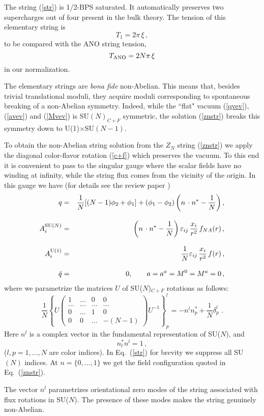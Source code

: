 \documentclass[epsfig,12pt]{article}
\def\beqn{\begin{eqnarray}}
\def\eeqn{\end{eqnarray}}
\def\beq{\begin{equation}}
\def\eeq{\end{equation}}
\begin{document}
The  string (\ref{str}) is 1/2-BPS saturated. It automatically 
preserves two supercharges out of 
four present in the bulk theory.
The tension of this elementary string is
\beq
T_1=2\pi\,\xi\, ,
\label{ten}
\eeq
to be compared with  the   ANO
string tension,
\beq
T_{\rm ANO}=2N\pi\,\xi
\label{tenANO}
\eeq
in our normalization.

The elementary strings are {\em bona fide} non-Abelian.
This means that, besides trivial translational
moduli, they acquire moduli corresponding to spontaneous
breaking of a non-Abelian symmetry. Indeed, while the ``flat"
vacuum (\ref{qvev}), (\ref{avev}) and (\ref{Mvev}) 
is SU$(N)_{C+F}$ symmetric, the solution (\ref{znstr})
breaks this symmetry down to U(1)$\times$SU$(N-1)$.

To obtain the non-Abelian string solution from the $Z_N$ string
(\ref{znstr}) we apply the diagonal color-flavor rotation (\ref{c+f}) 
which preserves the vacuum. To this end
it is convenient to pass to the singular gauge where the scalar fields have
no winding at infinity, while the string flux comes from the vicinity of
the origin. In this gauge we have (for details see the review paper \cite{SYrev})
\beqn
q &=& \frac1N[(N-1)\phi_2 +\phi_1] +(\phi_1-\phi_2)\left(
n\,\cdot n^*-\frac1N\right) ,
\nonumber\\[3mm]
A^{{\rm SU}(N)}_i &=& \left( n\,\cdot n^*-\frac{1}{N}\right)
\varepsilon_{ij}\, \frac{x_i}{r^2}
\,
f_{NA}(r) \,,
\nonumber\\[3mm]
A^{{\rm U}(1)}_i &=& \frac1N
\varepsilon_{ij}\, \frac{x_i}{r^2} \, f(r) \, ,
\nonumber\\[3mm]
\tilde{q} & = & 0,\qquad a=a^a=M^0=M^a=0\,,
\label{str}
\eeqn
where
we parametrize the matrices $U$ of SU($N$)$_{C+F}$ rotations 
as follows:
\beq
\frac1N\left\{
U\left(
\begin{array}{cccc}
1 & ... & 0 & 0\\[2mm]
...&...&...&...\\[2mm]
0&  ... & 1 & 0\\[2mm]
0 & 0& ... & -(N-1)
\end{array}
\right)U^{-1}
\right\}^l_p=-n^l n_p^* +\frac1N \delta^l_p\,\, .
\label{n}
\eeq
Here $n^l$ is a complex vector
 in the fundamental representation of SU($N$), and
\beq
 n^*_l n^l =1\,,
\label{unitvec}
\eeq
($l,p=1, ..., N$ are color indices). In Eq.~(\ref{str}) for brevity we suppress 
all SU$(N)$  indices.
At $n=\{0,..., 1\}$ we get the field configuration quoted
in Eq.~(\ref{znstr}).

The vector $n^l$ parametrizes
orientational zero modes of the string associated with flux rotations
in  SU($N$). The presence of these modes makes the string genuinely
non-Abelian. 
\end{document}

